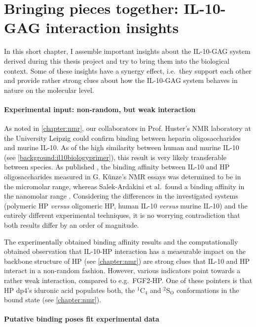 \chapter{Bringing pieces together: IL-10-GAG interaction insights}

In this short chapter, I assemble important insights about the IL-10-GAG system
derived during this thesis project and try to bring them into the biological
context. Some of these insights have a synergy effect, i.e.\ they support each
other and provide rather strong clues about how the IL-10-GAG system behaves in
nature on the molecular level.


\subsubsection{Experimental input: non-random, but weak interaction}

As noted in \cref{chapter:nmr}, our collaborators in Prof. Huster's NMR
laboratory at the University Leipzig could confirm binding between heparin
oligosaccharides and murine IL-10. As of the high similarity between human and
murine IL-10 (see \cref{background:il10biologyprimer}), this result is very
likely transferable between species. As published \cite{kuenze_gehrcke_2014},
the binding affinity between IL-10 and HP oligosaccharides measured in G.
Künze's NMR essays was determined to be in the micromolar range, whereas
Salek-Ardakini et al.\ found a binding affinity in the nanomolar range
\cite{salek_ardakani_2000}. Considering the differences in the investigated
systems (polymeric HP \textit{versus} oligomeric HP, human IL-10 \textit{versus}
murine IL-10) and the entirely different experimental techniques, it is no
worrying contradiction that both results differ by an order of magnitude.

The experimentally obtained binding affinity results and the computationally
obtained observation that IL-10-HP interaction has a measurable impact on the
backbone structure of HP (see \cref{chapter:nmr}) are strong clues that IL-10
and HP interact in a non-random fashion. However, various indicators point
towards a rather weak interaction, compared to e.g.\ FGF2-HP. One of these
pointers is that HP dp4's iduronic acid populates both, the ${}^1$C${}_4$ and
${}^2$S${}_\mathrm{O}$ conformations in the bound state (see
\cref{chapter:nmr}).


\subsubsection{Putative binding poses fit experimental data}


